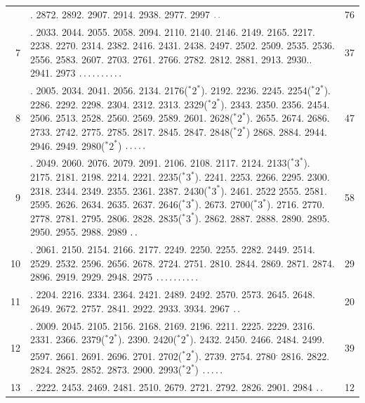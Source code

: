 \par\medskip
\begingroup\small
\setlength{\tabcolsep}{4pt}
\begin{longtable}{@{}r>{\raggedright\arraybackslash}p{}r@{}}
 & 2802. 2872. 2892. 2907. 2914. 2938. 2977. 2997 \(\mathinner{.\,.}\) & 76\\
7 & 2008. 2033. 2044. 2055. 2058. 2094. 2110. 2140. 2146. 2149. 2165. 2217. 2238. 2270. 2314. 2382. 2416. 2431. 2438. 2497. 2502. 2509. 2535. 2536. 2556. 2583. 2607. 2703. 2761. 2766. 2782. 2812. 2881. 2913. 2930.. 2941. 2973 \(\mathinner{.\,.\,.\,.\,.\,.\,.\,.\,.\,.}\) & 37\\
8 & 2004. 2005. 2034. 2041. 2056. 2134. 2176(${}^{*}2^{*}$). 2192. 2236. 2245. 2254(${}^{*}2^{*}$). 2286. 2292. 2298. 2304. 2312. 2313. 2329(${}^{*}2^{*}$). 2343. 2350. 2356. 2454. 2506. 2513. 2528. 2560. 2569. 2589. 2601. 2628(${}^{*}2^{*}$). 2655. 2674. 2686. 2733. 2742. 2775. 2785. 2817. 2845. 2847. 2848(${}^{*}2^{*}$) 2868. 2884. 2944. 2946. 2949. 2980(${}^{*}2^{*}$) \(\mathinner{.\,.\,.\,.\,.}\) & 47\\
9 & 2014. 2049. 2060. 2076. 2079. 2091. 2106. 2108. 2117. 2124. 2133(${}^{*}3^{*}$). 2175. 2181. 2198. 2214. 2221. 2235(${}^{*}3^{*}$). 2241. 2253. 2266. 2295. 2300. 2318. 2344. 2349. 2355. 2361. 2387. 2430(${}^{*}3^{*}$). 2461. 2522 2555. 2581. 2595. 2626. 2634. 2635. 2637. 2646(${}^{*}3^{*}$). 2673. 2700(${}^{*}3^{*}$). 2716. 2770. 2778. 2781. 2795. 2806. 2828. 2835(${}^{*}3^{*}$). 2862. 2887. 2888. 2890. 2895. 2950. 2955. 2988. 2989 \(\mathinner{.\,.}\) & 58\\
10 & 2057. 2061. 2150. 2154. 2166. 2177. 2249. 2250. 2255. 2282. 2449. 2514. 2529. 2532. 2596. 2656. 2678. 2724. 2751. 2810. 2844. 2869. 2871. 2874. 2896. 2919. 2929. 2948. 2975 \(\mathinner{.\,.\,.\,.\,.\,.\,.\,.\,.\,.}\) & 29\\
11 & 2135. 2204. 2216. 2334. 2364. 2421. 2489. 2492. 2570. 2573. 2645. 2648. 2649. 2672. 2757. 2841. 2922. 2933. 3934. 2967 \(\mathinner{.\,.}\) & 20\\
12 & 2006. 2009. 2045. 2105. 2156. 2168. 2169. 2196. 2211. 2225. 2229. 2316. 2331. 2366. 2379(${}^{*}2^{*}$). 2390. 2420(${}^{*}2^{*}$). 2432. 2450. 2466. 2484. 2499. 2597. 2661. 2691. 2696. 2701. 2702(${}^{*}2^{*}$). 2739. 2754. 2780\textsuperscript{.} 2816. 2822. 2824. 2825. 2852. 2873. 2900. 2993(${}^{*}2^{*}$) \(\mathinner{.\,.\,.\,.\,.}\) & 39\\
13 & 2015. 2222. 2453. 2469. 2481. 2510. 2679. 2721. 2792. 2826. 2901. 2984 \(\mathinner{.\,.}\) & 12\\

\end{longtable}
